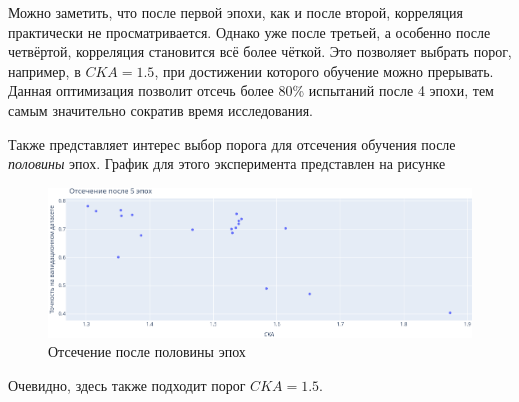 Можно заметить, что после первой эпохи, как и после второй, корреляция практически не просматривается.
Однако уже после третьей, а особенно после четвёртой, корреляция становится всё более чёткой.
Это позволяет выбрать порог, например, в $CKA = 1.5$, при достижении которого обучение можно прерывать.
Данная оптимизация позволит отсечь более 80\% испытаний после 4 эпохи, тем самым значительно сократив время исследования.

Также представляет интерес выбор порога для отсечения обучения после \textit{половины} эпох.
График для этого эксперимента представлен на рисунке
\begin{figure}[ht]
    \centering
    \includegraphics[width=\linewidth]{imgs/half_epochs.png}
    \caption{Отсечение после половины эпох}
\end{figure}
Очевидно, здесь также подходит порог $CKA = 1.5$.
